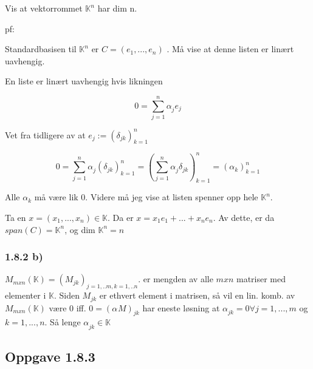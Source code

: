 \documentclass[11pt]{article}
\begin{document}
Vis at vektorrommet $ \mathbb{K}^n $ har dim n. 


pf:

Standardbasisen til $ \mathbb{K} ^n$ er $ C = (e_1, ..., e_n) $ . Må vise at denne listen er linært uavhengig.

En liste er linært uavhengig hvis likningen 

\[
     0 = \sum_{ j=1 }^{ n } \alpha_{j}^{} e_j
\] 

Vet fra tidligere av at $ e_j := (\delta_{jk})_{k=1}^n $ 

\[
     0 = \sum_{ j=1 }^{ n } \alpha_{j}^{} (\delta_{jk})_{k=1}^n = (\sum_{ j=1 }^{ n } \alpha_{j}^{} \delta_{jk})_{k=1}^n = (\alpha_k)_{k=1}^n
\] 

Alle $ \alpha_k $ må være lik 0. Videre må jeg vise at listen spenner opp hele $ \mathbb{K}^n $.


Ta en $ x = (x_1, ..., x_n) \in \mathbb{K}$. Da er $ x = x_1e_1 + ... + x_n e_n $. Av dette, er da $ span(C) = \mathbb{K}^n $, og dim $ \mathbb{K}^n = n$   



\subsubsection{1.8.2 b)}

$ M_{mxn}(\mathbb{K})  = (M_{jk})_{j=1,..m, k=1,..n}$. er mengden av alle $ mxn $ matriser med elementer i $ \mathbb{K} $. Siden $ M_{jk} $ er ethvert element i matrisen, så vil en lin. komb. av $ M_{mxn} (\mathbb{K}) $ være 0 iff. $ 0 = (\alpha_{}^{} M)_{jk} $ har eneste løsning at $ \alpha_{jk}^{} =0 \forall j=1,...,m$ og $ k=1,...,n $. Så lenge $ \alpha_{jk}^{} \in \mathbb{K} $


\subsection{Oppgave 1.8.3}
\end{document}
